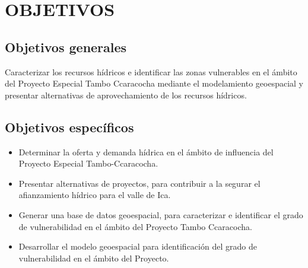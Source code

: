 \chapter{OBJETIVOS}
\thispagestyle{empty}

\section{Objetivos generales}
Caracterizar los recursos hídricos e identificar las zonas vulnerables en el ámbito del Proyecto Especial Tambo Ccaracocha mediante el modelamiento geoespacial y presentar alternativas de aprovechamiento de los recursos hídricos.

\section{Objetivos específicos}
\begin{itemize}
    \item Determinar la oferta y demanda hídrica en el ámbito de influencia del Proyecto Especial Tambo-Ccaracocha. 
    \item Presentar alternativas de proyectos, para contribuir a la segurar el afianzamiento hídrico para el valle de Ica. 
    \item Generar una base de datos geoespacial, para caracterizar e identificar el grado de vulnerabilidad en el ámbito del Proyecto Tambo Ccaracocha.
    \item Desarrollar el modelo geoespacial para identificación del grado de vulnerabilidad en el ámbito del Proyecto. 
\end{itemize}

